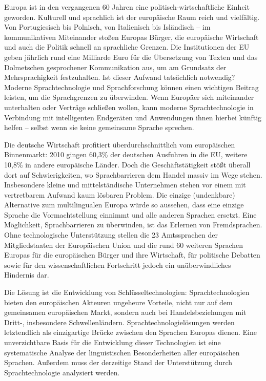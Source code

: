\documentclass[]{../../metanetpaper}
\begin{document}
\begin{multicols}{2}
Europa ist in den vergangenen 60 Jahren eine politisch-wirtschaftliche Einheit geworden. Kulturell und sprachlich ist der europäische Raum reich und vielfältig. Von Portugiesisch bis Polnisch, von Italienisch bis Isländisch -- im kommunikativen Miteinander stoßen Europas Bürger, die europäische Wirtschaft und auch die Politik schnell an sprachliche Grenzen. Die Institutionen der EU geben jährlich rund eine Milliarde Euro für die Übersetzung von Texten und das Dolmetschen gesprochener Kommunikation aus, um am Grundsatz der Mehrsprachigkeit festzuhalten. Ist dieser Aufwand tatsächlich notwendig? Moderne Sprachtechnologie und Sprachforschung können einen wichtigen Beitrag leisten, um die Sprachgrenzen zu überwinden. Wenn Europäer sich miteinander unterhalten oder Verträge schließen wollen, kann moderne Sprachtechnologie in Verbindung mit intelligenten Endgeräten und Anwendungen ihnen hierbei künftig helfen -- selbst wenn sie keine gemeinsame Sprache sprechen. 


Die deutsche Wirtschaft profitiert überdurchschnittlich vom europäischen Binnenmarkt: 2010 gingen 60,3\% der deutschen Ausfuhren in die EU, weitere 10,8\% in andere europäische Länder. Doch die Geschäftstätigkeit stößt überall dort auf Schwierigkeiten, wo Sprachbarrieren dem Handel massiv im Wege stehen. Insbesondere kleine und mittelständische Unternehmen stehen vor einem mit vertretbarem Aufwand kaum lösbaren Problem. Die einzige (undenkbare) Alternative zum multilingualen Europa würde so aussehen, dass eine einzige Sprache die Vormachtstellung einnimmt und alle anderen Sprachen ersetzt.  Eine Möglichkeit, Sprachbarrieren zu überwinden, ist das Erlernen von Fremdsprachen. Ohne technologische Unterstützung stellen die 23 Amts\-sprachen der Mitgliedstaaten der Europäischen Union und die rund 60 weiteren Sprachen Europas für die europäischen Bürger und ihre Wirtschaft, für politische Debatten sowie für den wissenschaftlichen Fortschritt jedoch ein unüberwindliches Hindernis dar.

Die Lösung ist die Entwicklung von Schlüsseltechnologien: Sprachtechnologien bieten den europäischen Akteuren ungeheure Vorteile, nicht nur auf dem gemeinsamen europäischen Markt, sondern auch bei Handelsbeziehungen mit Dritt-, insbesondere Schwellenländern. Sprachtechnologielösungen werden letztendlich als einzigartige Brücke zwischen den Sprachen Europas dienen. Eine unverzichtbare Basis für die Entwicklung dieser Technologien ist eine systematische Analyse der linguistischen Besonderheiten aller europäischen Sprachen. Außerdem muss der derzeitige Stand der Unterstützung durch Sprachtechnologie analysiert werden. 


\end{multicols}
\end{document}
